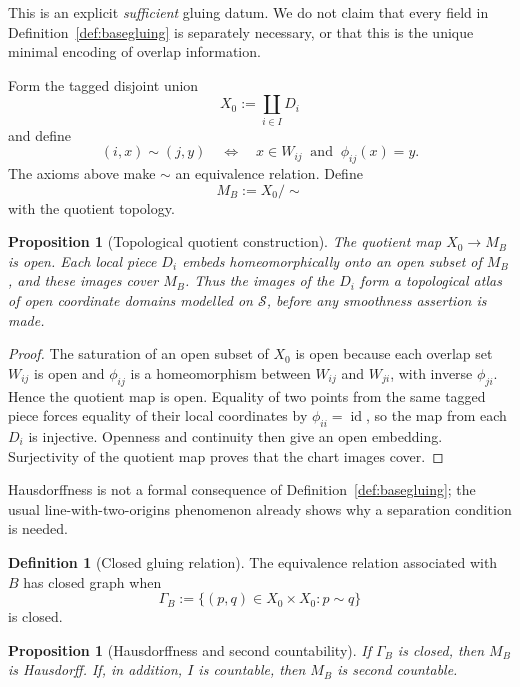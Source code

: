 \documentclass[11pt,a4paper]{article}
\newtheorem{proposition}[theorem]{Proposition}
\theoremstyle{definition}
\newtheorem{definition}[theorem]{Definition}
\theoremstyle{remark}
\newcommand{\Smodel}{\mathcal{S}}
\newcommand{\id}{\operatorname{id}}
\begin{document}
This is an explicit \emph{sufficient} gluing datum.  We do not
claim that every field in Definition~\ref{def:basegluing} is separately necessary,
or that this is the unique minimal encoding of overlap information.

Form the tagged disjoint union
\[
   X_{0}:=\coprod_{i\in I}D_i
\tag{5.3}
\]
and define
\[
   (i,x)\sim(j,y)
   \quad\Longleftrightarrow\quad
   x\in W_{ij}\ \text{ and }\ \phi_{ij}(x)=y.
\tag{5.4}
\]
The axioms above make \(\sim\) an equivalence relation.  Define
\[
   M_B:=X_{0}/\!\sim
\tag{5.5}
\]
with the quotient topology.

\begin{proposition}[Topological quotient construction]
\label{prop:top-reconstruct}
The quotient map \(X_{0}\to M_B\) is open.  Each local piece \(D_i\)
embeds homeomorphically onto an open subset of \(M_B\), and these images
cover \(M_B\).  Thus the images of the \(D_i\) form a topological atlas of open coordinate domains modelled on \(\Smodel\), before any smoothness assertion is made.
\end{proposition}

\begin{proof}
The saturation of an open subset of \(X_{0}\) is open because each
overlap set \(W_{ij}\) is open and \(\phi_{ij}\) is a homeomorphism
between \(W_{ij}\) and \(W_{ji}\), with inverse \(\phi_{ji}\).  Hence the
quotient map is open.  Equality of two points from the same tagged piece
forces equality of their local coordinates by \(\phi_{ii}=\id\), so the
map from each \(D_i\) is injective.  Openness and continuity then give an
open embedding.  Surjectivity of the quotient map proves that the chart
images cover.
\end{proof}

Hausdorffness is not a formal consequence of Definition~\ref{def:basegluing}; the
usual line-with-two-origins phenomenon already shows why a separation
condition is needed.

\begin{definition}[Closed gluing relation]
\label{def:closedgraph}
The equivalence relation associated with \(B\) has closed graph when
\[
   \Gamma_B
   :=
   \{(p,q)\in X_0\times X_0:p\sim q\}
\tag{5.6}
\]
is closed.
\end{definition}

\begin{proposition}[Hausdorffness and second countability]
\label{prop:haus-second}
If \(\Gamma_B\) is closed, then \(M_B\) is Hausdorff.  If, in addition,
\(I\) is countable, then \(M_B\) is second countable.
\end{proposition}
\end{document}
